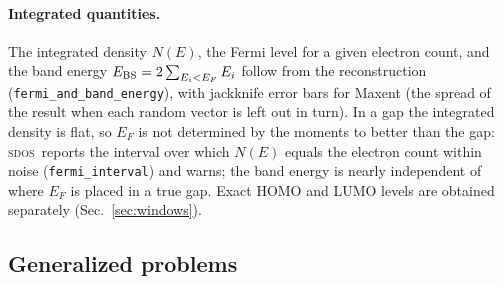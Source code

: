 \documentclass[reprint,nofootinbib,superscriptaddress,amsmath,amssymb,aps,prb,floatfix]{revtex4-2}
\newcommand{\sdos}{\textsc{sdos}}
\begin{document}
\paragraph*{Integrated quantities.}
The integrated density $N(E)$, the Fermi level for a given electron count, and the band energy $E_{\rm BS}=2\sum_{E_i<E_F}E_i$ follow from the reconstruction (\texttt{fermi\_and\_band\_energy}), with jackknife error bars for Maxent (the spread of the result when each random vector is left out in turn).
In a gap the integrated density is flat, so $E_F$ is not determined by the moments to better than the gap: \sdos\ reports the interval over which $N(E)$ equals the electron count within noise (\texttt{fermi\_interval}) and warns; the band energy is nearly independent of where $E_F$ is placed in a true gap.
Exact HOMO and LUMO levels are obtained separately (Sec.~\ref{sec:windows}).

\subsection{Generalized problems}
\label{sec:generalized}
\end{document}
